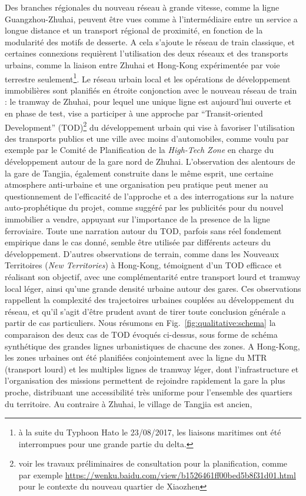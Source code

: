 {Des branches régionales du nouveau réseau à grande vitesse, comme la ligne Guangzhou-Zhuhai, peuvent être vues comme à l'intermédiaire entre un service a longue distance et un transport régional de proximité, en fonction de la modularité des motifs de desserte. A cela s'ajoute le réseau de train classique, et certaines connexions requièrent l'utilisation des deux réseaux et des transports urbains, comme la liaison entre Zhuhai et Hong-Kong expérimentée par voie terrestre seulement\footnote{à la suite du Typhoon Hato le 23/08/2017, les liaisons maritimes ont été interrompues pour une grande partie du delta.}. Le réseau urbain local et les opérations de développement immobilières sont planifiés en étroite conjonction avec le nouveau réseau de train : le tramway de Zhuhai, pour lequel une unique ligne est aujourd'hui ouverte et en phase de test, vise a participer à une approche par ``Transit-oriented Development'' (TOD)\footnote{voir les travaux préliminaires de consultation pour la planification, comme par exemple \url{https://wenku.baidu.com/view/b1526461ff00bed5b8f31d01.html} pour le contexte du nouveau quartier de Xiaozhen} du développement urbain qui vise à favoriser l'utilisation des transports publics et une ville avec moins d'automobiles, comme voulu par exemple par le Comité de Planification de la \emph{High-Tech Zone} en charge du développement autour de la gare nord de Zhuhai. L'observation des alentours de la gare de Tangjia, également construite dans le même esprit, une certaine atmosphere anti-urbaine et une organisation peu pratique peut mener au questionnement de l'efficacité de l'approche et a des interrogations sur la nature auto-prophétique du projet, comme suggéré par les publicités pour du nouvel immobilier a vendre,  appuyant sur l'importance de la presence de la ligne ferroviaire. Toute une narration autour du TOD, parfois sans réel fondement empirique dans le cas donné, semble être utilisée par différents acteurs du développement. D'autres observations de terrain, comme dans les Nouveaux Territoires (\emph{New Territories}) à Hong-Kong, témoignent d'un TOD efficace et réalisant son objectif, avec une complémentarité entre transport lourd et tramway local léger, ainsi qu'une grande densité urbaine autour des gares. Ces observations rappellent la complexité des trajectoires urbaines couplées au développement du réseau, et qu'il s'agit d'être prudent avant de tirer toute conclusion générale a partir de cas particuliers. Nous résumons en Fig.~\ref{fig:qualitative:schema} la comparaison des deux cas de TOD évoqués ci-dessus, sous forme de schéma synthétique des grandes lignes urbanistiques de chacune des zones. A Hong-Kong, les zones urbaines ont été planifiées conjointement avec la ligne du MTR (transport lourd) et les multiples lignes de tramway léger, dont l'infrastructure et l'organisation des missions permettent de rejoindre rapidement la gare la plus proche, distribuant une accessibilité très uniforme pour l'ensemble des quartiers du territoire. Au contraire à Zhuhai, le village de Tangjia est ancien, }
